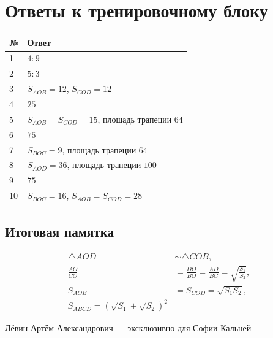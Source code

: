 \documentclass[a4paper,12pt]{article}
\newcommand{\ST}{S_{ABCD}}
\begin{document}
\section*{Ответы к тренировочному блоку}
\vspace{6mm}
\renewcommand{\arraystretch}{1.60}
\begin{center}
\begin{tabularx}{\linewidth}{@{}p{14mm}X@{}}
\toprule
\textbf{№} & \textbf{Ответ} \\
\midrule
1 & $4:9$ \\
2 & $5:3$ \\
3 & $S_{AOB}=12$, $S_{COD}=12$ \\
4 & $25$ \\
5 & $S_{AOB}=S_{COD}=15$, площадь трапеции $64$ \\
6 & $75$ \\
7 & $S_{BOC}=9$, площадь трапеции $64$ \\
8 & $S_{AOD}=36$, площадь трапеции $100$ \\
9 & $75$ \\
10 & $S_{BOC}=16$, $S_{AOB}=S_{COD}=28$ \\
\bottomrule
\end{tabularx}
\end{center}
\vspace{12mm}
\subsection*{Итоговая памятка}
\begin{align*}
\triangle AOD&\sim\triangle COB,\\[2mm]
\frac{AO}{CO}&=\frac{DO}{BO}=\frac{AD}{BC}=\sqrt{\frac{S_1}{S_2}},\\[2mm]
S_{AOB}&=S_{COD}=\sqrt{S_1S_2},\\[2mm]
\boxed{\ST=(\sqrt{S_1}+\sqrt{S_2})^2}
\end{align*}
\vfill
\begin{center}
\small\color{quietgray} Лёвин Артём Александрович --- эксклюзивно для Софии Кальней
\end{center}
\end{document}
